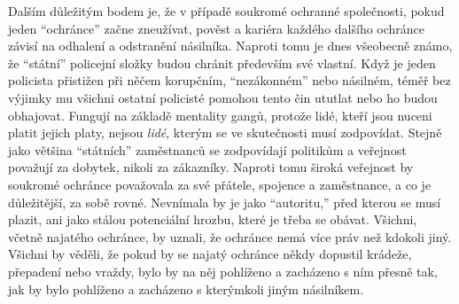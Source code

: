 \documentclass{book}
\begin{document}
Dalším důležitým bodem je, že v případě soukromé ochranné společnosti, pokud jeden \enquote{ochránce} začne zneužívat, pověst a kariéra každého dalšího ochránce závisí na odhalení a odstranění násilníka. Naproti tomu je dnes všeobecně známo, že \enquote{státní} policejní složky budou chránit především své vlastní. Když je jeden policista přistižen při něčem korupčním, \enquote{nezákonném} nebo násilném, téměř bez výjimky mu všichni ostatní policisté pomohou tento čin ututlat nebo ho budou obhajovat. Fungují na základě mentality gangů, protože lidé, kteří jsou nuceni platit jejich platy, nejsou \emph{lidé}, kterým se ve skutečnosti musí zodpovídat. Stejně jako většina \enquote{státních} zaměstnanců se zodpovídají politikům a veřejnost považují za dobytek, nikoli za zákazníky. Naproti tomu široká veřejnost by soukromé ochránce považovala za své přátele, spojence a zaměstnance, a co je důležitější, za sobě rovné. Nevnímala by je jako \enquote{autoritu,} před kterou se musí plazit, ani jako stálou potenciální hrozbu, které je třeba se obávat. Všichni, včetně najatého ochránce, by uznali, že ochránce nemá více práv než kdokoli jiný. Všichni by věděli, že pokud by se najatý ochránce někdy dopustil krádeže, přepadení nebo vraždy, bylo by na něj pohlíženo a zacházeno s ním přesně tak, jak by bylo pohlíženo a zacházeno s kterýmkoli jiným násilníkem.
\end{document}
